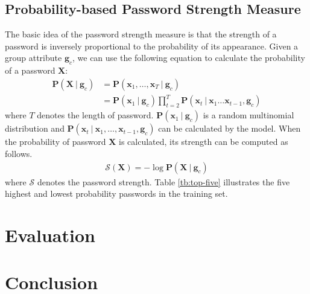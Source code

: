 \documentclass[10pt, twocolumnjournal]{IEEEtran}
\begin{document}
\subsection{Probability-based Password Strength Measure}
The basic idea of the password strength measure is that the strength of a password is inversely proportional to the probability of its appearance. Given a group attribute $\bm g_c$, we can use the following equation to calculate the probability of a password $\bm X$:
\begin{equation*}
\begin{aligned}
	\bm P(\bm X\ |\ \bm g_c) & = \bm P(\bm x_1, \ldots, \bm x_T\ |\ \bm g_c)\\
	 & = \bm P(\bm x_1\ |\ \bm g_c)\prod_{t=2}^{T} \bm P(\bm x_t\ |\ \bm x_1\ldots\bm x_{t-1}, \bm g_c)
\end{aligned}
\end{equation*} 
where $T$ denotes the length of password. $\bm P(\bm x_1\ |\ \bm g_c)$ is a random multinomial distribution and $\bm P(\bm x_t\ |\ \bm x_1,\ldots, \bm x_{t-1}, \bm g_c )$ can be calculated by the model. When the probability of password $\bm X$ is calculated, its strength can be computed as follows.
\begin{equation*}
	\begin{aligned}
		\mathcal S(\bm X) = -\log \bm P(\bm X\ |\ \bm g_c) 
	\end{aligned}
\end{equation*}
where $\mathcal S$ denotes the password strength. Table \ref{tb:top-five} illustrates the five highest and lowest probability passwords in the training set.
\begin{table}
	\caption{Table of five worst/best passwords in training set}
	\label{tb:top-five}
	\centering
	\qquad
\end{table}

\section{Evaluation}
\label{sec:evaluation}
	 
\section{Conclusion}
	
	

\nocite{*}
	
\end{document}
